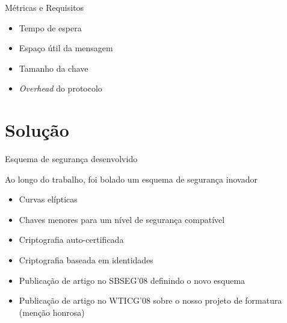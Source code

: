 \documentclass[notes,blue,mathserif]{beamer}
\begin{document}

\begin{frame}{M\'{e}tricas e Requisitos}
\begin{itemize}[<+->]
\item Tempo de espera
\item Espa\c{c}o \'{u}til da mensagem
\item Tamanho da chave
\item \textit{Overhead} do protocolo
\end{itemize}
\end{frame}

\section{Solu\c{c}\~{a}o}

\begin{frame}{Esquema de seguran\c{c}a desenvolvido}

Ao longo do trabalho, foi bolado um esquema de seguran\c{c}a inovador

\begin{itemize}[<+->]
\item Curvas el\'{i}pticas
\item Chaves menores para um n\'{i}vel de seguran\c{c}a compat\'{i}vel
\item Criptografia auto-certificada
\item Criptografia baseada em identidades
\item Publica\c{c}\~{a}o de artigo no SBSEG'08 definindo o novo esquema
\item Publica\c{c}\~{a}o de artigo no WTICG'08 sobre o nosso projeto de formatura (men\c{c}\~{a}o honrosa)
\end{itemize}

\end{frame}
\end{document}
